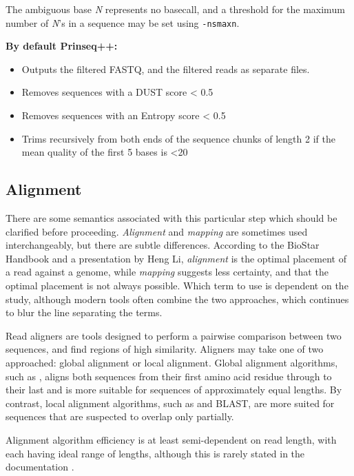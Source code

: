 The ambiguous base \textit{N} represents no basecall, and a threshold for the maximum number of \textit{N}'s in a sequence may be set using \texttt{-ns\textunderscore max\textunderscore n}.
    
\textbf{By default Prinseq++:}
\begin{itemize}\itemsep0em
\item Outputs the filtered FASTQ, and the filtered reads as separate files.
\item Removes sequences with a DUST score < 0.5
\item Removes sequences with an Entropy score < 0.5 
\item Trims recursively from both ends of the sequence chunks of length 2 if the mean quality of the first 5 bases is <20 
\end{itemize}

\subsection{Alignment}

There are some semantics associated with this particular step which should be clarified before proceeding. \textit{Alignment} and \textit{mapping} are sometimes used interchangeably, but there are subtle differences. According to the BioStar Handbook \citep{albert2020biostar} and a presentation by Heng Li, \textit{alignment} is the optimal placement of a read against a genome, while \textit{mapping} suggests less certainty, and that the optimal placement is not always possible. Which term to use is dependent on the study, although modern tools often combine the two approaches, which continues to blur the line separating the terms. 

Read aligners are tools designed to perform a pairwise comparison between two sequences, and find regions of high similarity. Aligners may take one of two approached: global alignment or local alignment. Global alignment algorithms, such as \cite{needleman1970general}, aligns both sequences from their first amino acid residue through to their last and is more suitable for sequences of approximately equal lengths. By contrast, local alignment algorithms, such as \cite{smith1981identification} and BLAST, are more suited for sequences that are suspected to overlap only partially.

Alignment algorithm efficiency is at least semi-dependent on read length, with each having ideal range of lengths, although this is rarely stated in the documentation \citep{albert2020biostar}.



